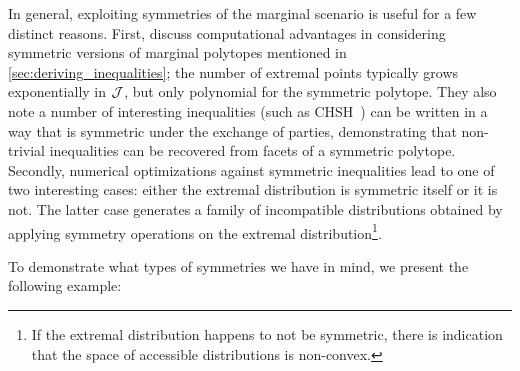 \documentclass[aps, 10pt, english, twoside, pra, nofootinbib, tightenlines, longbibliography, superscriptaddress]{revtex4-1}
\begin{document}
    In general, exploiting symmetries of the marginal scenario is useful for a few distinct reasons. First, \citet{Bancal_2010} discuss computational advantages in considering symmetric versions of marginal polytopes mentioned in \cref{sec:deriving_inequalities}; the number of extremal points typically grows exponentially in $\mathcal{J}$, but only polynomial for the symmetric polytope. They also note a number of interesting inequalities (such as CHSH~\cite{CHSH_Original}) can be written in a way that is symmetric under the exchange of parties, demonstrating that non-trivial inequalities can be recovered from facets of a symmetric polytope. Secondly, numerical optimizations against symmetric inequalities lead to one of two interesting cases: either the extremal distribution is symmetric itself or it is not. The latter case generates a family of incompatible distributions obtained by applying symmetry operations on the extremal distribution\footnote{If the extremal distribution happens to not be symmetric, there is indication that the space of accessible distributions is non-convex.}.

    To demonstrate what types of symmetries we have in mind, we present the following example:
\end{document}
